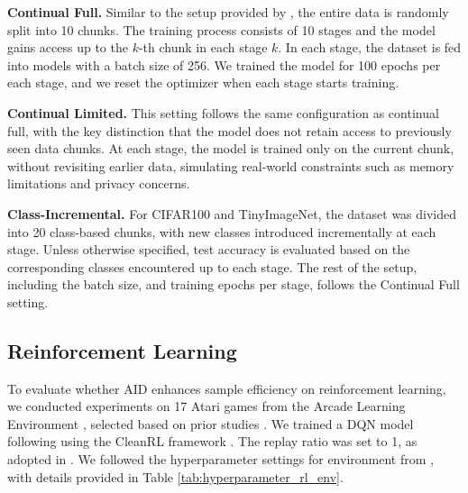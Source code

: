 \textbf{Continual Full. } Similar to the setup provided by \cite{shen2024step}, the entire data is randomly split into 10 chunks.
The training process consists of 10 stages and the model gains access up to the $k$-th chunk in each stage $k$.
In each stage, the dataset is fed into models with a batch size of 256.
We trained the model for 100 epochs per each stage, and we reset the optimizer when each stage starts training.

\textbf{Continual Limited. } This setting follows the same configuration as continual full, with the key distinction that the model does not retain access to previously seen data chunks.
At each stage, the model is trained only on the current chunk, without revisiting earlier data, simulating real-world constraints such as memory limitations and privacy concerns.

\textbf{Class-Incremental. } For CIFAR100 and TinyImageNet, the dataset was divided into 20 class-based chunks, with new classes introduced incrementally at each stage.
Unless otherwise specified, test accuracy is evaluated based on the corresponding classes encountered up to each stage.
The rest of the setup, including the batch size, and training epochs per stage, follows the Continual Full setting.










\subsection{Reinforcement Learning}
\label{app:reinforcement_learning}
To evaluate whether AID enhances sample efficiency on reinforcement learning, we conducted experiments on 17 Atari games from the Arcade Learning Environment \cite{bellemare2013arcade}, selected based on prior studies \cite{kumar2020implicit,sokar2023dormant}. We trained a DQN model following \citet{mnih2015human} using the CleanRL framework \cite{huang2022cleanrl}. The replay ratio was set to 1, as adopted in \citet{sokar2023dormant, elsayed2024weight}. We followed the hyperparameter settings for environment from \citet{sokar2023dormant}, with details provided in Table \ref{tab:hyperparameter_rl_env}.



